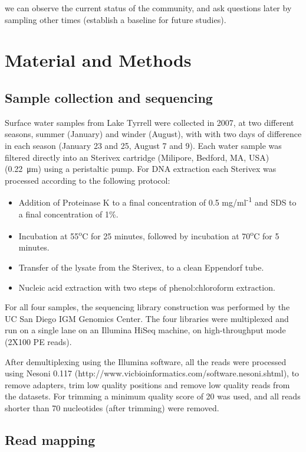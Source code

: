 we can observe the current status of the community, and ask questions later by sampling other times (establish a baseline for future studies).

\section{Material and Methods}

\subsection{Sample collection and sequencing}
Surface water samples from Lake Tyrrell were collected in 2007, at two different seasons, summer (January) and winder (August), with with two days of difference in each season (January 23 and 25, August 7 and 9). Each water sample was filtered directly into an Sterivex cartridge (Milipore, Bedford, MA, USA) (\SI{0.22}{\micro\meter}) using a peristaltic pump. For DNA extraction each Sterivex was processed according to the following protocol:
\begin{itemize}
\item Addition of Proteinase K to a final concentration of 0.5 mg/ml\textsuperscript{-1} and SDS to a final concentration of 1\%.
\item Incubation at 55\textsuperscript{o}C for 25 minutes, followed by incubation at 70\textsuperscript{o}C for 5 minutes.
\item Transfer of the lysate from the Sterivex, to a clean Eppendorf tube.
\item Nucleic acid extraction with two steps of phenol:chloroform extraction. 
\end{itemize}

For all four samples, the sequencing library construction was performed by the UC San Diego IGM Genomics Center. The four libraries were multiplexed and run on a single lane on an Illumina HiSeq machine, on high-throughput mode (2X100 PE reads).

After demultiplexing using the Illumina software, all the reads were processed using Nesoni 0.117 (http://www.vicbioinformatics.com/software.nesoni.shtml), to remove adapters, trim low quality positions and remove low quality reads from the datasets. For trimming a minimum quality score of 20 was used, and all reads shorter than 70 nucleotides (after trimming) were removed.

\subsection{Read mapping}

